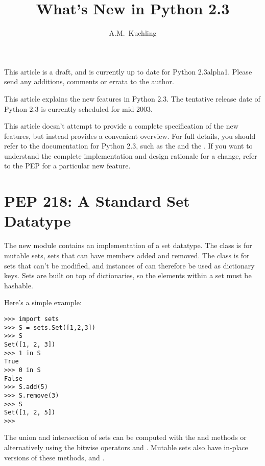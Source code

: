 \documentclass{howto}
\title{What's New in Python 2.3}
\author{A.M.\ Kuchling}
\begin{document}
\maketitle
\tableofcontents



{\large This article is a draft, and is currently up to date for
Python 2.3alpha1.  Please send any additions, comments or errata to
the author.}

This article explains the new features in Python 2.3.  The tentative
release date of Python 2.3 is currently scheduled for mid-2003.

This article doesn't attempt to provide a complete specification of
the new features, but instead provides a convenient overview.  For
full details, you should refer to the documentation for Python 2.3,
such as the  and
the .  If you want
to understand the complete implementation and design rationale for a
change, refer to the PEP for a particular new feature.


\section{PEP 218: A Standard Set Datatype}

The new  module contains an implementation of a set
datatype.  The  class is for mutable sets, sets that can
have members added and removed.  The  class is for
sets that can't be modified, and instances of  can
therefore be used as dictionary keys.  Sets are built on top of
dictionaries, so the elements within a set must be hashable.

Here's a simple example:

\begin{verbatim}
>>> import sets
>>> S = sets.Set([1,2,3])
>>> S
Set([1, 2, 3])
>>> 1 in S
True
>>> 0 in S
False
>>> S.add(5)
>>> S.remove(3)
>>> S
Set([1, 2, 5])
>>>
\end{verbatim}

The union and intersection of sets can be computed with the
 and  methods or
alternatively using the bitwise operators \code{\&} and \code{|}.
Mutable sets also have in-place versions of these methods,
 and .
\end{document}
